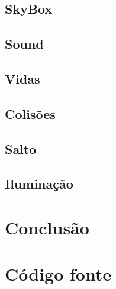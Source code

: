 \documentclass[12pt,a4paper,portuges]{style/myreport}
\begin{document}
\section{SkyBox}


\section{Sound}


\section{Vidas}


\section{Colisões}


\section{Salto}

\section{Iluminação}

\newpage

\chapter{Conclusão}




\appendix
\chapter{Código fonte}
\end{document}
